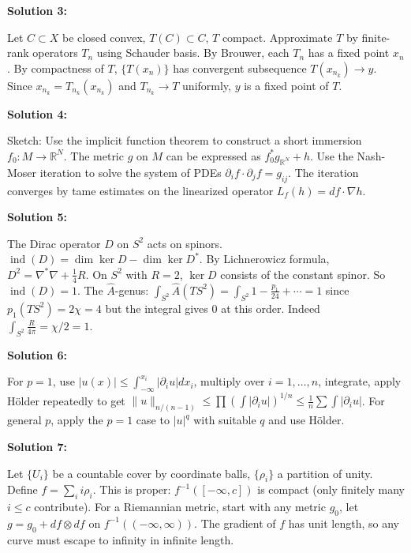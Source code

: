 \documentclass[12pt,a4paper]{exam}
\begin{document}
\vspace{0.5cm}

\textbf{Solution 3:}

Let $C \subset X$ be closed convex, $T(C) \subset C$, $T$ compact. Approximate $T$ by finite-rank operators $T_n$ using Schauder basis. By Brouwer, each $T_n$ has a fixed point $x_n$. By compactness of $T$, $\{T(x_n)\}$ has convergent subsequence $T(x_{n_k}) \to y$. Since $x_{n_k} = T_{n_k}(x_{n_k})$ and $T_{n_k} \to T$ uniformly, $y$ is a fixed point of $T$.

\vspace{0.5cm}

\textbf{Solution 4:}

Sketch: Use the implicit function theorem to construct a short immersion $f_0: M \to \mathbb{R}^N$. The metric $g$ on $M$ can be expressed as $f_0^*g_{\mathbb{R}^N} + h$. Use the Nash-Moser iteration to solve the system of PDEs $\partial_i f \cdot \partial_j f = g_{ij}$. The iteration converges by tame estimates on the linearized operator $L_f(h) = df \cdot \nabla h$.

\vspace{0.5cm}

\textbf{Solution 5:}

The Dirac operator $D$ on $S^2$ acts on spinors. $\operatorname{ind}(D) = \dim\ker D - \dim\ker D^*$. By Lichnerowicz formula, $D^2 = \nabla^*\nabla + \frac{1}{4}R$. On $S^2$ with $R=2$, $\ker D$ consists of the constant spinor. So $\operatorname{ind}(D) = 1$. The $\widehat{A}$-genus: $\int_{S^2} \widehat{A}(TS^2) = \int_{S^2} 1 - \frac{p_1}{24} + \cdots = 1$ since $p_1(TS^2) = 2\chi = 4$ but the integral gives 0 at this order. Indeed $\int_{S^2} \frac{R}{4\pi} = \chi/2 = 1$.

\vspace{0.5cm}

\textbf{Solution 6:}

For $p=1$, use $|u(x)| \leq \int_{-\infty}^{x_i} |\partial_i u| dx_i$, multiply over $i=1,\ldots,n$, integrate, apply H\"older repeatedly to get $\|u\|_{n/(n-1)} \leq \prod (\int |\partial_i u|)^{1/n} \leq \frac{1}{n} \sum \int |\partial_i u|$. For general $p$, apply the $p=1$ case to $|u|^q$ with suitable $q$ and use H\"older.

\vspace{0.5cm}

\textbf{Solution 7:}

Let $\{U_i\}$ be a countable cover by coordinate balls, $\{\rho_i\}$ a partition of unity. Define $f = \sum_i i \rho_i$. This is proper: $f^{-1}([-\infty, c])$ is compact (only finitely many $i \leq c$ contribute). For a Riemannian metric, start with any metric $g_0$, let $g = g_0 + df \otimes df$ on $f^{-1}((-\infty, \infty))$. The gradient of $f$ has unit length, so any curve must escape to infinity in infinite length.
\end{document}

